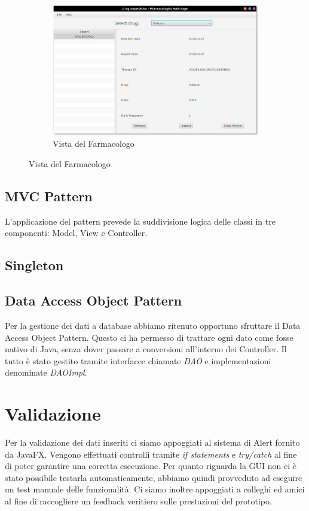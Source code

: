 \documentclass[a4paper, 11pt]{article}
\begin{document}
\begin{figure}[H]
			\begin{subfigure}[h]{\textwidth}
				\centering
				\includegraphics[height=0.3\textheight]{Pharmacologist-view.png}
				\caption{Vista del Farmacologo}
			\end{subfigure}
		\end{figure}
	
		\subsection{MVC Pattern}
		L'applicazione del pattern prevede la suddivisione logica delle classi in tre componenti: Model, View e Controller. \newline
		
		
		\subsection{Singleton}
		
		\subsection{Data Access Object Pattern}
		Per la gestione dei dati a database abbiamo ritenuto opportuno sfruttare il Data Access Object Pattern. Questo ci ha permesso di trattare ogni dato come fosse nativo di Java, senza dover passare a conversioni all'interno dei Controller. Il tutto è stato gestito tramite interfacce chiamate \textit{DAO} e implementazioni denominate \textit{DAOImpl}.
		
		\section{Validazione}
		Per la validazione dei dati inseriti ci siamo appoggiati al sistema di Alert fornito da JavaFX. Vengono effettuati controlli tramite \textit{if statements} e \textit{try/catch} al fine di poter garantire una corretta esecuzione.\newline
		Per quanto riguarda la GUI non ci è stato possibile testarla automaticamente, abbiamo quindi provveduto ad eseguire un test manuale delle funzionalità. Ci siamo inoltre appoggiati a colleghi ed amici al fine di raccogliere un feedback veritiero sulle prestazioni del prototipo.
		
\end{document}
